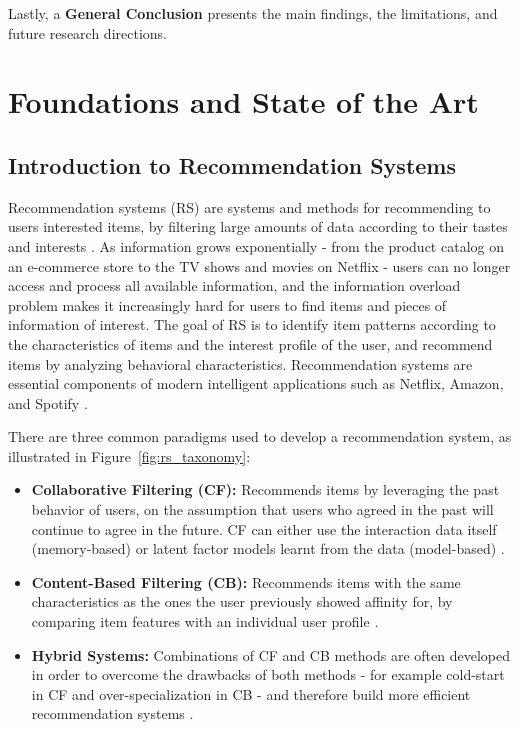 \documentclass[12pt,a4paper]{report}
\begin{document}
Lastly, a \textbf{General Conclusion} presents the main findings, the
limitations, and future research directions.


\chapter{Foundations and State of the Art}

\section{Introduction to Recommendation Systems}

Recommendation systems (RS) are systems and methods for recommending to users
interested items, by filtering large amounts of data according to their tastes
and interests \citep{castells2023primer}. As information grows exponentially -
from the product catalog on an e-commerce store to the TV shows and movies on
Netflix - users can no longer access and process all available information,
and the information overload problem makes it increasingly hard for users to
find items and pieces of information of interest. The goal of RS is to identify
item patterns according to the characteristics of items and the interest profile
of the user, and recommend items by analyzing behavioral characteristics.
Recommendation systems are essential components of modern intelligent
applications such as Netflix, Amazon, and Spotify \citep{raza2024comprehensive}.

There are three common paradigms used to develop a recommendation system, as
illustrated in Figure~\ref{fig:rs_taxonomy}:

\begin{itemize}
    \item \textbf{Collaborative Filtering (CF):} Recommends items by
    leveraging the past behavior of users, on the assumption that users who
    agreed in the past will continue to agree in the future. CF can either
    use the interaction data itself (memory-based) or latent factor models
    learnt from the data (model-based) \citep{castells2023primer}.

    \item \textbf{Content-Based Filtering (CB):} Recommends items with the
    same characteristics as the ones the user previously showed affinity for,
    by comparing item features with an individual user profile
    \citep{raza2024comprehensive}.

    \item \textbf{Hybrid Systems:} Combinations of CF and CB methods are often
    developed in order to overcome the drawbacks of both methods - for
    example cold-start in CF and over-specialization in CB - and therefore
    build more efficient recommendation systems \citep{raza2024comprehensive}.
\end{itemize}
\end{document}

